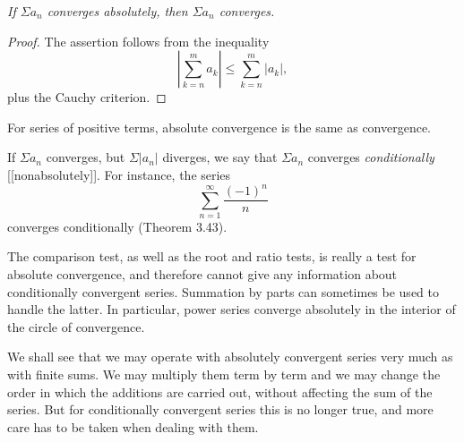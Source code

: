 \emph{If $\Sigma a_n$ converges absolutely, then $\Sigma a_n$ converges.}

\begin{proof}
The assertion follows from the inequality
\[ \left|\sum_{k=n}^{m} a_k\right| \le \sum_{k=n}^{m} |a_k|, \]
plus the Cauchy criterion.
\end{proof}

For series of positive terms, absolute convergence is the same as convergence.

If $\Sigma a_n$ converges, but $\Sigma|a_n|$ diverges, we say that
$\Sigma a_n$ converges \emph{conditionally} [[nonabsolutely]]. For instance, the series
\[ \sum_{n=1}^{\infty} \frac{(-1)^n}{n} \]
converges conditionally (Theorem 3.43).

The comparison test, as well as the root and ratio tests, is really a test for
absolute convergence, and therefore cannot give any information about
conditionally convergent series. Summation by parts can sometimes be used to
handle the latter. In particular, power series converge absolutely in the
interior of the circle of convergence.

We shall see that we may operate with absolutely convergent series very much as
with finite sums. We may multiply them term by term and we may change the order
in which the additions are carried out, without affecting the sum of the
series. But for conditionally convergent series this is no longer true, and
more care has to be taken when dealing with them.
